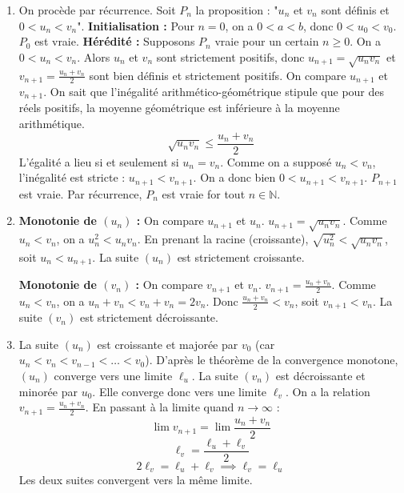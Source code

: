 \documentclass[]{exercices}
\begin{document}
\begin{solution}
	\begin{enumerate}
		\item On procède par récurrence. Soit $P_n$ la proposition : "$u_n$ et $v_n$ sont définis et $0 < u_n < v_n$".
		      \textbf{Initialisation :} Pour $n=0$, on a $0 < a < b$, donc $0 < u_0 < v_0$. $P_0$ est vraie.
		      \textbf{Hérédité :} Supposons $P_n$ vraie pour un certain $n \ge 0$. On a $0 < u_n < v_n$.
		      Alors $u_n$ et $v_n$ sont strictement positifs, donc $u_{n+1}=\sqrt{u_n v_n}$ et $v_{n+1}=\frac{u_n+v_n}{2}$ sont bien définis et strictement positifs.
		      On compare $u_{n+1}$ et $v_{n+1}$. On sait que l'inégalité arithmético-géométrique stipule que pour des réels positifs, la moyenne géométrique est inférieure à la moyenne arithmétique.
		      \[ \sqrt{u_n v_n} \le \frac{u_n+v_n}{2} \]
		      L'égalité a lieu si et seulement si $u_n=v_n$. Comme on a supposé $u_n < v_n$, l'inégalité est stricte : $u_{n+1} < v_{n+1}$.
		      On a donc bien $0 < u_{n+1} < v_{n+1}$. $P_{n+1}$ est vraie.
		      Par récurrence, $P_n$ est vraie for tout $n \in \mathbb{N}$.
		\item \textbf{Monotonie de $(u_n)$ :} On compare $u_{n+1}$ et $u_n$.
		      $u_{n+1} = \sqrt{u_n v_n}$. Comme $u_n < v_n$, on a $u_n^2 < u_n v_n$. En prenant la racine (croissante), $\sqrt{u_n^2} < \sqrt{u_n v_n}$, soit $u_n < u_{n+1}$. La suite $(u_n)$ est strictement croissante.

		      \textbf{Monotonie de $(v_n)$ :} On compare $v_{n+1}$ et $v_n$.
		      $v_{n+1} = \frac{u_n+v_n}{2}$. Comme $u_n < v_n$, on a $u_n+v_n < v_n+v_n = 2v_n$. Donc $\frac{u_n+v_n}{2} < v_n$, soit $v_{n+1} < v_n$. La suite $(v_n)$ est strictement décroissante.
		\item La suite $(u_n)$ est croissante et majorée par $v_0$ (car $u_n < v_n < v_{n-1} < \dots < v_0$). D'après le théorème de la convergence monotone, $(u_n)$ converge vers une limite $\ell_u$.
		      La suite $(v_n)$ est décroissante et minorée par $u_0$. Elle converge donc vers une limite $\ell_v$.
		      On a la relation $v_{n+1} = \frac{u_n+v_n}{2}$. En passant à la limite quand $n \to \infty$ :
		      \[ \lim v_{n+1} = \lim \frac{u_n+v_n}{2} \]
		      \[ \ell_v = \frac{\ell_u + \ell_v}{2} \]
		      \[ 2\ell_v = \ell_u + \ell_v \implies \ell_v = \ell_u \]
		      Les deux suites convergent vers la même limite.
	\end{enumerate}
\end{solution}
\end{document}
